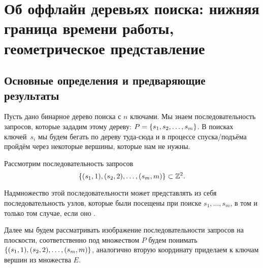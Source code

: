 \documentclass[a4paper,11pt]{article}
\begin{document}
\section{Об оффлайн деревьях поиска: нижняя граница времени работы, геометрическое представление}

\subsection{Основные определения и предваряющие результаты}

Пусть дано бинарное дерево поиска с $n$ ключами. Мы знаем последовательность запросов, которые зададим этому дереву: $P = \lbrace s_1,s_2,\ldots,s_m\rbrace$. В поисках ключей~$s_i$ мы будем бегать по дереву туда-сюда и в процессе спуска/подъёма пройдём через некоторые вершины, которые нам не нужны.




\begin{theorem}
	Рассмотрим последовательность запросов
	\begin{equation*}
		\lbrace(s_1,1),(s_2,2),\ldots,(s_m,m)\rbrace \subset {\mathbb Z}^2.
	\end{equation*}

	Надмножество этой последовательности может представлять из себя последовательность узлов, которые были посещены при поиске $s_1, \ldots, s_m$, в том и только том случае, если оно \arbs.
\end{theorem}

Далее мы будем рассматривать изображение последовательности запросов на плоскости, соответственно под множеством $P$ будем понимать $\lbrace(s_1,1),(s_2,2),\ldots,(s_m,m)\rbrace$, аналогично вторую координату приделаем к ключам вершин из множества $E$.
\end{document}
